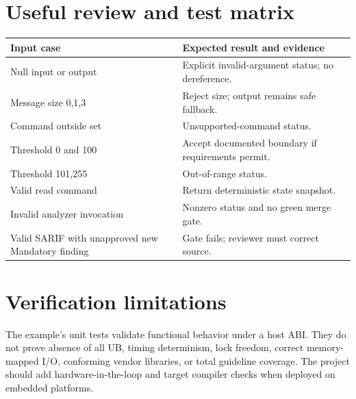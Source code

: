 \documentclass[10pt,letterpaper]{article}
\begin{document}
\section{Useful review and test matrix}
\begin{tabularx}{\linewidth}{@{}>{\raggedright\arraybackslash}p{.23\linewidth}>{\raggedright\arraybackslash}X@{}}\toprule
Input case & Expected result and evidence\\\midrule
Null input or output & Explicit invalid-argument status; no dereference.\\
Message size 0,1,3 & Reject size; output remains safe fallback.\\
Command outside set & Unsupported-command status.\\
Threshold 0 and 100 & Accept documented boundary if requirements permit.\\
Threshold 101,255 & Out-of-range status.\\
Valid read command & Return deterministic state snapshot.\\
Invalid analyzer invocation & Nonzero status and no green merge gate.\\
Valid SARIF with unapproved new Mandatory finding & Gate fails; reviewer must correct source.\\\bottomrule\end{tabularx}
\section{Verification limitations}
The example's unit tests validate functional behavior under a host ABI. They do not prove absence of all UB, timing determinism, lock freedom, correct memory-mapped I/O, conforming vendor libraries, or total guideline coverage. The project should add hardware-in-the-loop and target compiler checks when deployed on embedded platforms.
\end{document}
